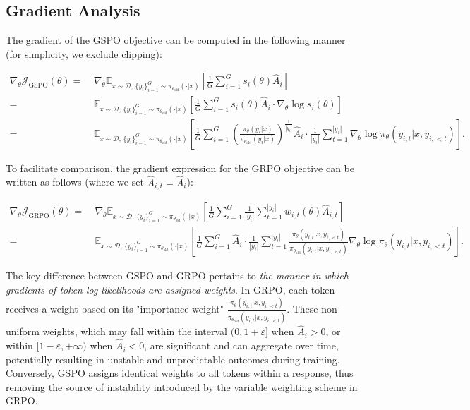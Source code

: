 \subsection{Gradient Analysis}
\label{subsec:gradient}

The gradient of the GSPO objective can be computed in the following manner (for simplicity, we exclude clipping):

\begin{align}
\nabla_{\theta} \mathcal{J}_\text{GSPO} (\theta)
=&\ 
\nabla_{\theta} \mathbb{E}_{ x \sim \mathcal{D},\, \{y_i\}_{i=1}^G \sim \pi_{\theta_\text{old}}( \cdot | x) }
\left[ 
\frac{1}{G} \sum_{i=1}^{G} s_{i}(\theta) \widehat{A}_{i}
\right] \\
= &\ 
\mathbb{E}_{ x \sim \mathcal{D},\, \{y_i\}_{i=1}^G \sim \pi_{\theta_\text{old}}( \cdot | x) }
\left[ 
\frac{1}{G} \sum_{i=1}^{G}
s_{i}(\theta) \widehat{A}_{i}
\cdot \nabla_{\theta} \log s_{i}(\theta)
\right] \\
=&\ 
\mathbb{E}_{ x \sim \mathcal{D},\, \{y_i\}_{i=1}^G \sim \pi_{\theta_\text{old}}( \cdot | x) }
\left[ 
\frac{1}{G} \sum_{i=1}^{G} 
\left( \frac{ \pi_{\theta} (y_i | x) }{ \pi_{\theta_\text{old}} (y_i | x)} \right)^{\frac{1}{|y_i|}} \widehat{A}_{i} 
\cdot \frac{1}{|y_i|} \sum_{t=1}^{|y_i|} \nabla_{\theta} \log \pi_{\theta} (y_{i,t} | x, y_{i,<t}) 
\right].
\label{equ:gspo_grad}
\end{align}

To facilitate comparison, the gradient expression for the GRPO objective can be written as follows (where we set $\widehat{A}_{i,t} = \widehat{A}_{i}$):

\begin{align}
\nabla_{\theta} \mathcal{J}_\text{GRPO} (\theta) 
=&\ 
\nabla_{\theta} \mathbb{E}_{ x \sim \mathcal{D},\, \{y_i\}_{i=1}^G \sim \pi_{\theta_\text{old}}( \cdot | x) }
\left[ \frac{1}{G} \sum_{i=1}^{G} \frac{1}{|y_i|} \sum_{t=1}^{|y_i|} 
w_{i,t}(\theta) \widehat{A}_{i,t}
\right] \\
=&\
\mathbb{E}_{ x \sim \mathcal{D},\, \{y_i\}_{i=1}^G \sim \pi_{\theta_\text{old}}( \cdot | x) }
\left[ \frac{1}{G} \sum_{i=1}^{G} \widehat{A}_{i} 
\cdot \frac{1}{|y_i|} \sum_{t=1}^{|y_i|} 
\frac{ \pi_{\theta} (y_{i,t} | x, y_{i,<t}) }{ \pi_{\theta_\text{old}} (y_{i,t} | x,y_{i,<t})} 
\nabla_{\theta} \log \pi_{\theta} (y_{i,t} | x, y_{i,<t})  
\right].
\end{align}

The key difference between GSPO and GRPO pertains to \textit{the manner in which gradients of token log likelihoods are assigned weights}. In GRPO, each token receives a weight based on its "importance weight" $\frac{ \pi_{\theta} (y_{i,t} | x, y_{i,<t}) }{ \pi_{\theta_\text{old}} (y_{i,t} | x,y_{i,<t})}$. These non-uniform weights, which may fall within the interval $(0, 1+\varepsilon]$ when $\widehat{A}_{i} >0$, or within $[1-\varepsilon, +\infty)$ when $\widehat{A}_{i} < 0$, are significant and can aggregate over time, potentially resulting in unstable and unpredictable outcomes during training. Conversely, GSPO assigns identical weights to all tokens within a response, thus removing the source of instability introduced by the variable weighting scheme in GRPO.

